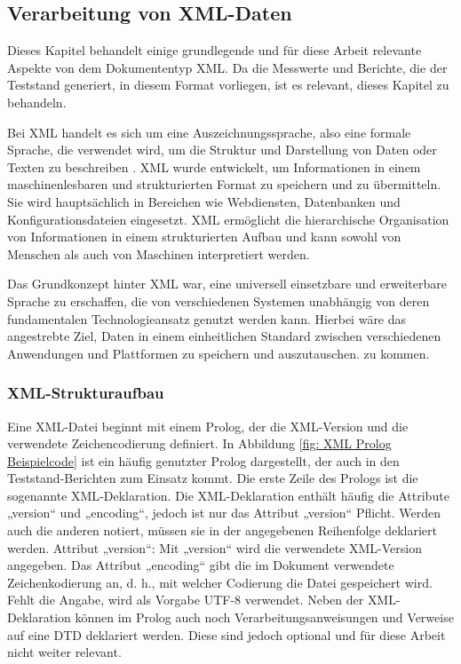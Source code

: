 \subsection{Verarbeitung von XML-Daten}
\label{subsec:verarbeitung-von-xml-daten}
Dieses Kapitel behandelt einige grundlegende und für diese Arbeit relevante Aspekte von dem Dokumententyp \ac{XML}.
Da die Messwerte und Berichte, die der Teststand generiert, in diesem Format vorliegen, ist es relevant, dieses Kapitel zu behandeln.

Bei \ac{XML} handelt es sich um eine Auszeichnungssprache, also eine
formale Sprache, die verwendet wird, um die Struktur und Darstellung von Daten oder Texten zu beschreiben \cite*{Neumann2019}.
\ac{XML} wurde entwickelt, um Informationen in einem maschinenlesbaren und strukturierten Format zu speichern und zu übermitteln.
Sie wird hauptsächlich in Bereichen wie Webdiensten, Datenbanken und Konfigurationsdateien eingesetzt.
\ac{XML} ermöglicht die hierarchische Organisation von Informationen in einem strukturierten Aufbau und kann sowohl von Menschen
als auch von Maschinen interpretiert werden. \cite*[4]{PeterBrezany2003}

Das Grundkonzept hinter \ac{XML} war, eine universell einsetzbare und erweiterbare Sprache zu erschaffen, die von verschiedenen Systemen
unabhängig von deren fundamentalen Technologieansatz genutzt werden kann.
Hierbei wäre das angestrebte Ziel, Daten in einem einheitlichen Standard zwischen verschiedenen Anwendungen und Plattformen zu speichern und auszutauschen.
zu kommen. \cite*[3-5] {PeterBrezany2003}

\subsubsection{XML-Strukturaufbau}

Eine \ac{XML}-Datei beginnt mit einem Prolog, der die \ac{XML}-Version und die verwendete Zeichencodierung definiert.
In Abbildung \ref{fig: XML Prolog Beispielcode} ist ein häufig genutzter Prolog dargestellt, der auch in den Teststand-Berichten zum Einsatz kommt.
Die erste Zeile des Prologs ist die sogenannte \ac{XML}-Deklaration.
Die XML-Deklaration enthält häufig die Attribute „version“ und „encoding“, jedoch ist nur das Attribut „version“ Pflicht.
Werden auch die anderen notiert, müssen sie in der angegebenen Reihenfolge deklariert werden.
Attribut „version“: Mit „version“ wird die verwendete \ac{XML}-Version angegeben.
Das Attribut „encoding“ gibt die im Dokument verwendete Zeichenkodierung an, d. h., mit welcher Codierung die Datei gespeichert wird.
Fehlt die Angabe, wird als Vorgabe \ac{UTF-8} verwendet.
Neben der \ac{XML}-Deklaration können im Prolog auch noch Verarbeitungsanweisungen und Verweise auf eine \ac{DTD} deklariert werden. Diese sind jedoch optional und für diese Arbeit nicht weiter relevant.
\cite*[8,9]{Becher2022}

